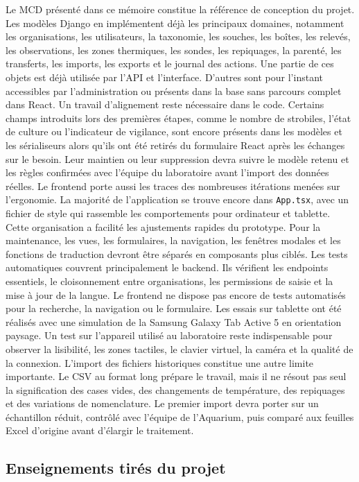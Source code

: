\documentclass{article}
\begin{document}
Le MCD présenté dans ce mémoire constitue la référence de conception du projet. Les modèles Django en implémentent déjà les principaux domaines, notamment les organisations, les utilisateurs, la taxonomie, les souches, les boîtes, les relevés, les observations, les zones thermiques, les sondes, les repiquages, la parenté, les transferts, les imports, les exports et le journal des actions. Une partie de ces objets est déjà utilisée par l’API et l’interface. D’autres sont pour l’instant accessibles par l’administration ou présents dans la base sans parcours complet dans React.
Un travail d’alignement reste nécessaire dans le code. Certains champs introduits lors des premières étapes, comme le nombre de strobiles, l’état de culture ou l’indicateur de vigilance, sont encore présents dans les modèles et les sérialiseurs alors qu’ils ont été retirés du formulaire React après les échanges sur le besoin. Leur maintien ou leur suppression devra suivre le modèle retenu et les règles confirmées avec l’équipe du laboratoire avant l’import des données réelles.
Le frontend porte aussi les traces des nombreuses itérations menées sur l’ergonomie. La majorité de l’application se trouve encore dans \texttt{App.tsx}, avec un fichier de style qui rassemble les comportements pour ordinateur et tablette. Cette organisation a facilité les ajustements rapides du prototype. Pour la maintenance, les vues, les formulaires, la navigation, les fenêtres modales et les fonctions de traduction devront être séparés en composants plus ciblés.
Les tests automatiques couvrent principalement le backend. Ils vérifient les endpoints essentiels, le cloisonnement entre organisations, les permissions de saisie et la mise à jour de la langue. Le frontend ne dispose pas encore de tests automatisés pour la recherche, la navigation ou le formulaire. Les essais sur tablette ont été réalisés avec une simulation de la Samsung Galaxy Tab Active 5 en orientation paysage. Un test sur l’appareil utilisé au laboratoire reste indispensable pour observer la lisibilité, les zones tactiles, le clavier virtuel, la caméra et la qualité de la connexion. L’import des fichiers historiques constitue une autre limite importante. Le CSV au format long prépare le travail, mais il ne résout pas seul la signification des cases vides, des changements de température, des repiquages et des variations de nomenclature. Le premier import devra porter sur un échantillon réduit, contrôlé avec l’équipe de l’Aquarium, puis comparé aux feuilles Excel d’origine avant d’élargir le traitement.

\subsection{Enseignements tirés du projet}
\end{document}
